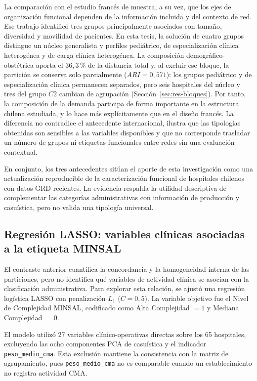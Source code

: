 La comparación con el estudio francés de \citet{Chrusciel2021} muestra, a su
vez, que los ejes de organización funcional dependen de la información incluida
y del contexto de red. Ese trabajo identificó tres grupos principalmente
asociados con tamaño, diversidad y movilidad de pacientes. En esta tesis, la
solución de cuatro grupos distingue un núcleo generalista y perfiles pediátrico,
de especialización clínica heterogénea y de carga clínica heterogénea. La composición
demográfico-obstétrica aporta el $36{,}3\,\%$ de la distancia total y, al
excluir ese bloque, la partición se conserva solo parcialmente ($ARI=0{,}571$):
los grupos pediátrico y de especialización clínica permanecen separados, pero seis hospitales
del núcleo y tres del grupo $C2$ cambian de agrupación
(Sección~\ref{sec:res-bloques}). Por tanto, la composición de la demanda
participa de forma importante en la estructura chilena estudiada, y lo hace más
explícitamente que en el diseño francés. La diferencia no contradice el antecedente internacional, ilustra que
las tipologías obtenidas son sensibles a las variables disponibles y que no
corresponde trasladar un número de grupos ni etiquetas funcionales entre redes
sin una evaluación contextual.

En conjunto, los tres antecedentes sitúan el aporte de esta investigación como una
actualización reproducible de la caracterización funcional de hospitales
chilenos con datos GRD recientes. La evidencia respalda la utilidad descriptiva
de complementar las categorías administrativas con información de producción y
casuística, pero no valida una tipología universal.

\subsection{Regresión LASSO: variables clínicas asociadas a la etiqueta MINSAL}
\label{sec:res-lasso}

El contraste anterior cuantifica la concordancia y la homogeneidad interna de
las particiones, pero no identifica qué variables de actividad clínica se
asocian con la clasificación administrativa. Para explorar esta relación, se
ajustó una regresión logística LASSO con penalización $L_1$ ($C=0{,}5$). La
variable objetivo fue el Nivel de Complejidad MINSAL, codificado como Alta
Complejidad $=1$ y Mediana Complejidad $=0$.

El modelo utilizó 27 variables clínico-operativas directas sobre los 65
hospitales, excluyendo las ocho componentes PCA de casuística y el indicador
\texttt{peso\_medio\_cma}. Esta exclusión mantiene la consistencia con la
matriz de agrupamiento, pues \texttt{peso\_medio\_cma} no es comparable cuando un
establecimiento no registra actividad CMA.

